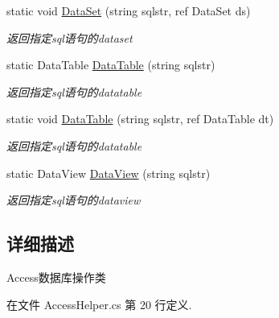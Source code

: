 \begin{DoxyCompactItemize}
static void \hyperlink{class_x_c_l_net_tools_1_1_data_base_1_1_access_1_1_access_helper_aa66ad22b5bfc24c630e34a62a085995f}{Data\-Set} (string sqlstr, ref Data\-Set ds)
\begin{DoxyCompactList}\small\item\em 返回指定sql语句的dataset \end{DoxyCompactList}\item 
static Data\-Table \hyperlink{class_x_c_l_net_tools_1_1_data_base_1_1_access_1_1_access_helper_aec0d16c3a29668e1298500b0f87d0f6e}{Data\-Table} (string sqlstr)
\begin{DoxyCompactList}\small\item\em 返回指定sql语句的datatable \end{DoxyCompactList}\item 
static void \hyperlink{class_x_c_l_net_tools_1_1_data_base_1_1_access_1_1_access_helper_a4ee3cbd4a9212d6df954c2228c2ff2f4}{Data\-Table} (string sqlstr, ref Data\-Table dt)
\begin{DoxyCompactList}\small\item\em 返回指定sql语句的datatable \end{DoxyCompactList}\item 
static Data\-View \hyperlink{class_x_c_l_net_tools_1_1_data_base_1_1_access_1_1_access_helper_a3979a6d17790d9ecc1cc9c4bcf56de84}{Data\-View} (string sqlstr)
\begin{DoxyCompactList}\small\item\em 返回指定sql语句的dataview \end{DoxyCompactList}\end{DoxyCompactItemize}


\subsection{详细描述}
Access数据库操作类 



在文件 Access\-Helper.\-cs 第 20 行定义.




